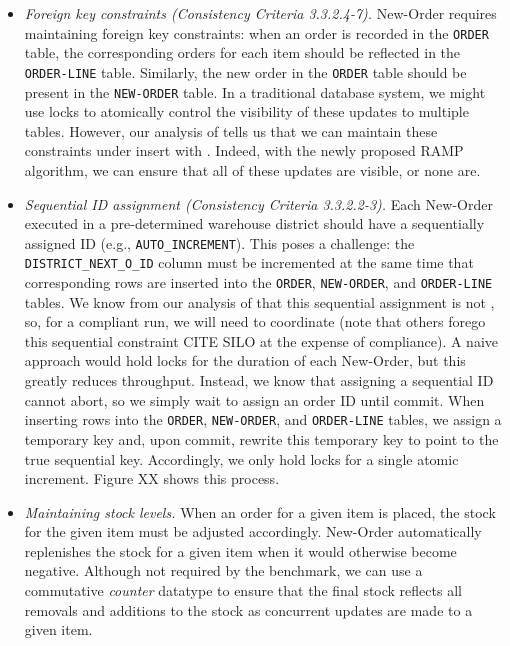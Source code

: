 \begin{itemize}

\item \textit{Foreign key constraints (Consistency Criteria
  3.3.2.4-7).} New-Order requires maintaining foreign key constraints:
  when an order is recorded in the \texttt{ORDER} table, the
  corresponding orders for each item should be reflected in the
  \texttt{ORDER-LINE} table. Similarly, the new order in the
  \texttt{ORDER} table should be present in the \texttt{NEW-ORDER}
  table. In a traditional database system, we might use locks to
  atomically control the visibility of these updates to multiple
  tables. However, our analysis of \lang tells us that we can maintain
  these constraints under insert with \cfreedom. Indeed, with the
  newly proposed \cfree RAMP algorithm, we can ensure that all of
  these updates are visible, or none are.

\item \textit{Sequential ID assignment (Consistency Criteria
  3.3.2.2-3).} Each New-Order executed in a pre-determined warehouse
  district should have a sequentially assigned ID (e.g.,
  \texttt{AUTO\_INCREMENT}). This poses a challenge: the
  \texttt{DISTRICT\_NEXT\_O\_ID} column must be incremented at the
  same time that corresponding rows are inserted into the
  \texttt{ORDER}, \texttt{NEW-ORDER}, and \texttt{ORDER-LINE}
  tables. We know from our analysis of \lang that this sequential
  assignment is not \cfree, so, for a compliant run, we will need to
  coordinate (note that others forego this sequential constraint CITE
  SILO at the expense of compliance). A naive approach would hold
  locks for the duration of each New-Order, but this greatly reduces
  throughput. Instead, we know that assigning a sequential ID cannot
  abort, so we simply wait to assign an order ID until commit. When
  inserting rows into the \texttt{ORDER}, \texttt{NEW-ORDER}, and
  \texttt{ORDER-LINE} tables, we assign a temporary key and, upon
  commit, rewrite this temporary key to point to the true sequential
  key. Accordingly, we only hold locks for a single atomic
  increment. Figure XX shows this process.

\item \textit{Maintaining stock levels.} When an order for a given
  item is placed, the stock for the given item must be adjusted
  accordingly. New-Order automatically replenishes the stock for a
  given item when it would otherwise become negative. Although not
  required by the benchmark, we can use a commutative \textit{counter}
  datatype to ensure that the final stock reflects all removals and
  additions to the stock as concurrent updates are made to a given item.
\end{itemize}

